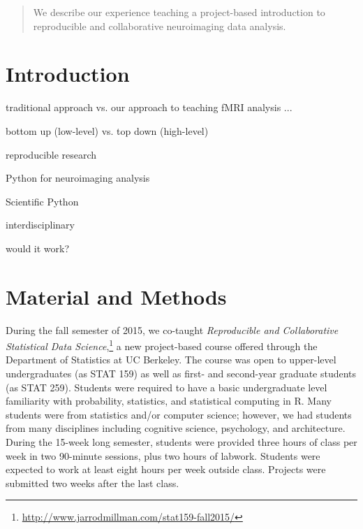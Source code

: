\maketitle

\wordcount

\begin{abstract} %
We describe our experience teaching a project-based introduction to
reproducible and collaborative neuroimaging data analysis.

\tiny
\end{abstract}

\section{Introduction}

traditional approach vs. our approach to teaching fMRI analysis ...

bottom up (low-level) vs. top down (high-level)

reproducible research \citep{millman2014developing}

Python for neuroimaging analysis \citep{millman2007analysis}

Scientific Python \citep{millman2011python}

interdisciplinary

would it work?

\section{Material and Methods}

During the fall semester of 2015, we co-taught \emph{Reproducible and Collaborative
Statistical Data Science},\footnote{\url{http://www.jarrodmillman.com/stat159-fall2015/}}
a new project-based course offered through the Department of Statistics at UC Berkeley.
The course was open to upper-level undergraduates (as STAT 159) as well as
first- and second-year graduate students (as STAT 259).
Students were required to have a basic undergraduate level familiarity with
probability, statistics, and statistical computing in R.
Many students were from statistics and/or computer science; however, we had
students from many disciplines including cognitive science, psychology, and
architecture.
During the 15-week long semester, students were provided three hours of class
per week in two 90-minute sessions, plus two hours of labwork.
Students were expected to work at least eight hours per week outside class.
Projects were submitted two weeks after the last class.

